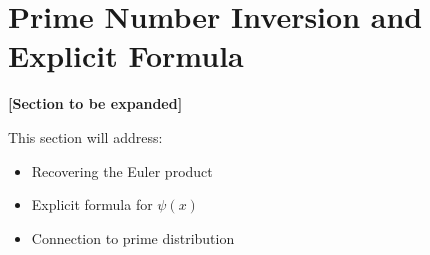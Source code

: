 \section{Prime Number Inversion and Explicit Formula}
\label{sec:inversion_primes}

\textbf{[Section to be expanded]}

This section will address:
\begin{itemize}
\item Recovering the Euler product
\item Explicit formula for $\psi(x)$
\item Connection to prime distribution
\end{itemize}
